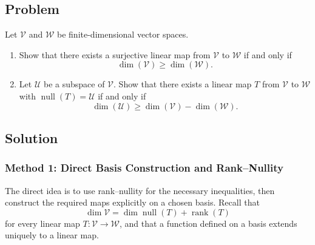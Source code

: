 \documentclass[12pt]{article}
\newcommand{\V}{\mathcal{V}}
\newcommand{\W}{\mathcal{W}}
\newcommand{\U}{\mathcal{U}}
\newcommand{\Null}{\operatorname{null}}
\newcommand{\rank}{\operatorname{rank}}
\begin{document}
\subsection{Problem}
Let $\V$ and $\W$ be finite-dimensional vector spaces.
\begin{enumerate}[label=(\alph*)]
  \item Show that there exists a surjective linear map from $\V$ to $\W$ if and only if
  \[
  \dim(\V)\ge\dim(\W).
  \]
  \item Let $\U$ be a subspace of $\V$. Show that there exists a linear map $T$ from $\V$ to $\W$ with $\Null(T)=\U$ if and only if
  \[
  \dim(\U)\ge\dim(\V)-\dim(\W).
  \]
\end{enumerate}

\bigskip
\subsection{Solution}

\subsubsection{Method 1: Direct Basis Construction and Rank--Nullity}
The direct idea is to use rank--nullity for the necessary inequalities, then construct the required maps explicitly on a chosen basis. Recall that
\[
\dim\V=\dim\Null(T)+\rank(T)
\]
for every linear map $T:\V\to\W$, and that a function defined on a basis extends uniquely to a linear map.
\end{document}
